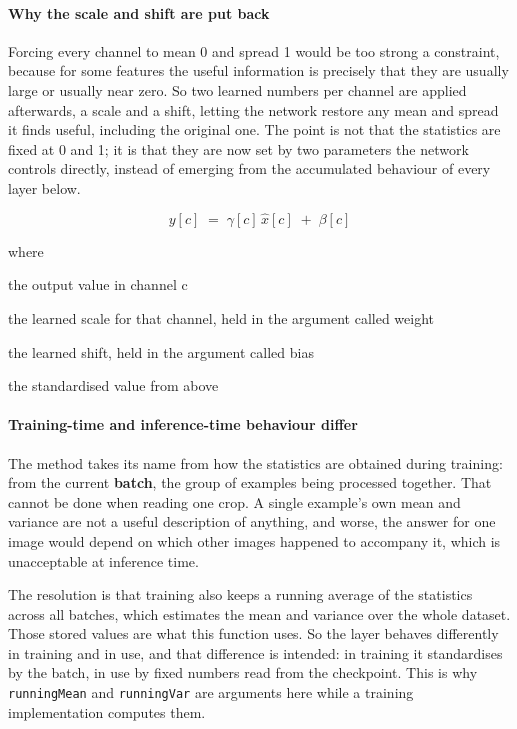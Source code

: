 \paragraph{Why the scale and shift are put back}
Forcing every channel to mean 0 and spread 1 would be too strong a constraint, because for some features the useful information is precisely that they are usually large or usually near zero. So two learned numbers per channel are applied afterwards, a scale and a shift, letting the network restore any mean and spread it finds useful, including the original one. The point is not that the statistics are fixed at 0 and 1; it is that they are now set by two parameters the network controls directly, instead of emerging from the accumulated behaviour of every layer below.


\begin{equation}
y[c] \;=\; \gamma[c] \, \hat{x}[c] \;+\; \beta[c]
\end{equation}

\noindent where
\begin{description}[leftmargin=2.4em,style=nextline,font=\normalfont\ttfamily]\setlength\itemsep{1pt}
  \item[{$y[c]$}] \normalfont the output value in channel c
  \item[{$\gamma[c]$}] \normalfont the learned scale for that channel, held in the argument called weight
  \item[{$\beta[c]$}] \normalfont the learned shift, held in the argument called bias
  \item[{$\hat{x}[c]$}] \normalfont the standardised value from above
\end{description}

\paragraph{Training-time and inference-time behaviour differ}
The method takes its name from how the statistics are obtained during training: from the current \textbf{batch}, the group of examples being processed together. That cannot be done when reading one crop. A single example's own mean and variance are not a useful description of anything, and worse, the answer for one image would depend on which other images happened to accompany it, which is unacceptable at inference time.

The resolution is that training also keeps a running average of the statistics across all batches, which estimates the mean and variance over the whole dataset. Those stored values are what this function uses. So the layer behaves differently in training and in use, and that difference is intended: in training it standardises by the batch, in use by fixed numbers read from the checkpoint. This is why \texttt{runningMean} and \texttt{runningVar} are arguments here while a training implementation computes them.


